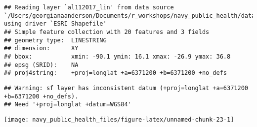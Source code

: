 \documentclass[]{tufte-book}
\newenvironment{Shaded}{}{}
\newcommand{\DataTypeTok}[1]{\textcolor[rgb]{0.56,0.13,0.00}{#1}}
\newcommand{\DecValTok}[1]{\textcolor[rgb]{0.25,0.63,0.44}{#1}}
\newcommand{\FloatTok}[1]{\textcolor[rgb]{0.25,0.63,0.44}{#1}}
\newcommand{\KeywordTok}[1]{\textcolor[rgb]{0.00,0.44,0.13}{\textbf{#1}}}
\newcommand{\NormalTok}[1]{#1}
\newcommand{\OperatorTok}[1]{\textcolor[rgb]{0.40,0.40,0.40}{#1}}
\newcommand{\StringTok}[1]{\textcolor[rgb]{0.25,0.44,0.63}{#1}}
\begin{document}
\begin{verbatim}
## Reading layer `al112017_lin' from data source `/Users/georgianaanderson/Documents/r_workshops/navy_public_health/data/al112017_best_track' using driver `ESRI Shapefile'
## Simple feature collection with 20 features and 3 fields
## geometry type:  LINESTRING
## dimension:      XY
## bbox:           xmin: -90.1 ymin: 16.1 xmax: -26.9 ymax: 36.8
## epsg (SRID):    NA
## proj4string:    +proj=longlat +a=6371200 +b=6371200 +no_defs
\end{verbatim}

\begin{Shaded}
\end{Shaded}

\begin{verbatim}
## Warning: sf layer has inconsistent datum (+proj=longlat +a=6371200 +b=6371200 +no_defs).
## Need '+proj=longlat +datum=WGS84'
\end{verbatim}

\texttt{[image: navy\_public\_health\_files/figure-latex/unnamed-chunk-23-1]}
\end{document}
